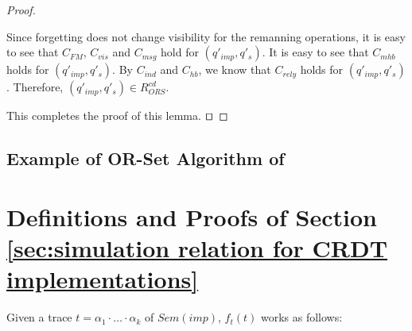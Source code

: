 \begin {proof}
\begin{itemize}
    Since forgetting does not change visibility for the remanning operations, it is easy to see that $C_{\mathit{FM}}$, $C_{\mathit{vis}}$ and $C_{\mathit{msg}}$ hold for $(q'_{\mathit{imp}},q'_s)$. It is easy to see that $C_{\mathit{mhb}}$ holds for $(q'_{\mathit{imp}},q'_s)$. By $C_{\mathit{ind}}$ and $C_{\mathit{hb}}$, we know that $C_{\mathit{rely}}$ holds for $(q'_{\mathit{imp}},q'_s)$. Therefore, $(q'_{\mathit{imp}},q'_s) \in R_{\mathit{ORS}}^{\mathit{cd}}$. 
\end{itemize} 

This completes the proof of this lemma. $\qed$
\end {proof}






\subsection{Example of OR-Set Algorithm of \cite{Bieniusa:2012}}
\label{subsec:example of or-set algorithm that does not assumes causal delivery}










\section{Definitions and Proofs of Section \ref{sec:simulation relation for CRDT implementations}}
\label{sec:appendix definitions and proofs of section simulation relation for CRDT implementations}


Given a trace $t = \alpha_1 \cdot \ldots \cdot \alpha_k$ of $Sem(imp)$, $f_t(t)$ works as follows:

